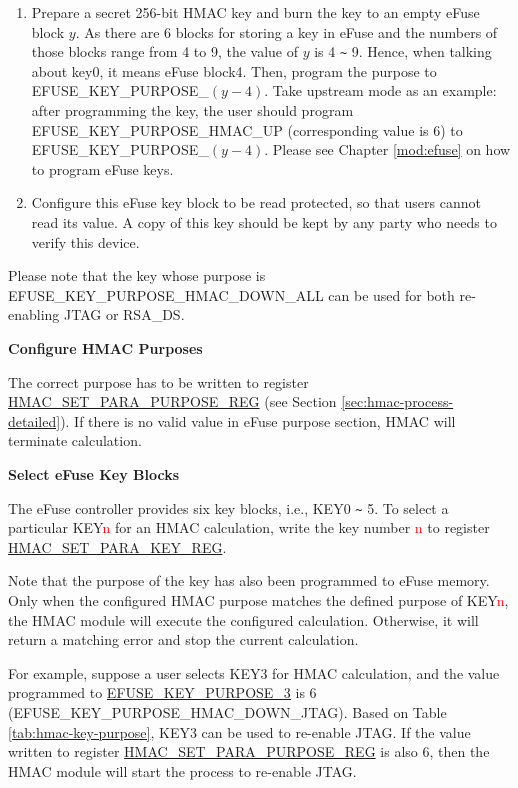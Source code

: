 \documentclass[main\_\_EN.tex]{subfiles}
\begin{document}
\begin{enumerate}
    \item Prepare a secret 256-bit HMAC key and burn the key to an empty eFuse block $y$. As there are 6 blocks for storing a key in eFuse and the numbers of those blocks range from 4 to 9, the value of $y$ is 4 \verb+~+ 9. Hence, when talking about key0, it means eFuse block4. Then, program the purpose to EFUSE\_KEY\_PURPOSE\_$(y-4)$. Take upstream mode as an example: after programming the key, the user should program EFUSE\_KEY\_PURPOSE\_HMAC\_UP (corresponding value is 6) to EFUSE\_KEY\_PURPOSE\_$(y-4)$. Please see Chapter \ref{mod:efuse} \textit{} on how to program eFuse keys.
    \item Configure this eFuse key block to be read protected, so that users cannot read its value. A copy of this key should be kept by any party who needs to verify this device.
\end{enumerate}

Please note that the key whose purpose is EFUSE\_KEY\_PURPOSE\_HMAC\_DOWN\_ALL can be used for both re-enabling JTAG or RSA\_DS.




\textbf{Configure HMAC Purposes}
\label{sec:hmac-config-purposes}

The correct purpose has to be written to register \hyperref[regdesc:HMACSETPARAPURPOSEREG]{HMAC\_SET\_PARA\_PURPOSE\_REG} (see Section \ref{sec:hmac-process-detailed}). If there is no valid value in eFuse purpose section, HMAC will terminate calculation.

\textbf{Select eFuse Key Blocks}
\label{sec:hmac-config-efuse-key}

The eFuse controller provides six key blocks, i.e., KEY0 \verb+~+ 5. To select a particular KEY\textcolor{red}{n} for an HMAC calculation, write the key number \textcolor{red}{n} to register \hyperref[regdesc:HMACSETPARAKEYREG]{HMAC\_SET\_PARA\_KEY\_REG}.

Note that the purpose of the key has also been programmed to eFuse memory. Only when the configured HMAC purpose matches the defined purpose of KEY\textcolor{red}{n}, the HMAC module will execute the configured calculation. Otherwise, it will return a matching error and stop the current calculation.

For example, suppose a user selects KEY3 for HMAC calculation, and the value programmed to \hyperref[fielddesc:EFUSEKEYPURPOSE3]{EFUSE\_KEY\_PURPOSE\_3} is 6 (EFUSE\_KEY\_PURPOSE\_HMAC\_DOWN\_JTAG). Based on Table \ref{tab:hmac-key-purpose}, KEY3 can be used to re-enable JTAG. If the value written to register \hyperref[regdesc:HMACSETPARAPURPOSEREG]{HMAC\_SET\_PARA\_PURPOSE\_REG} is also 6, then the HMAC module will start the process to re-enable JTAG.
\end{document}
